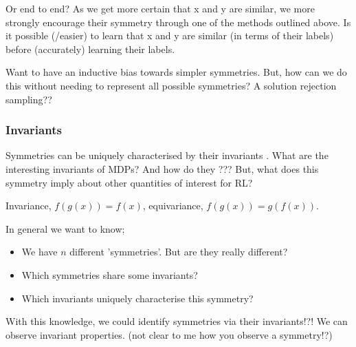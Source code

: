 \cite{Yang2019}

Or end to end? As we get more certain that x and y are similar, we more strongly
encourage their symmetry through one of the methods outlined above.
Is it possible (/easier) to learn that x and y are similar (in terms of their labels) before (accurately) learning their labels.



Want to have an inductive bias towards simpler symmetries. But, how can we do this without needing to represent all possible symmetries?
A solution rejection sampling??


%




\subsubsection{Invariants}

Symmetries can be uniquely characterised by their invariants \cite{PeterOlver1999}.
What are the interesting invariants of MDPs? And how do they ???
But, what does this symmetry imply about other quantities of interest for RL?

Invariance, $f(g(x)) = f(x)$, equivariance, $f(g(x)) = g(f(x))$.

In general we want to know;

\begin{itemize}
	\tightlist
	\item We have $n$ different 'symmetries'. But are they really different?
	\item Which symmetries share some invariants?
	\item Which invariants uniquely characterise this symmetry?
\end{itemize}

With this knowledge, we could identify symmetries via their invariants!?!
We can observe invariant properties. (not clear to me how you observe a symmetry!?)

